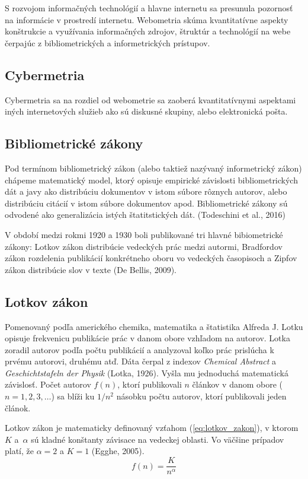 S rozvojom informačných technológií a hlavne internetu sa presunula pozornosť na
informácie v prostredí internetu.  Webometria skúma kvantitatívne aspekty
konštrukcie a využívania informačných zdrojov, štruktúr a technológií na webe
čerpajúc z bibliometrických a informetrických prístupov.


\subsection{Cybermetria}

Cybermetria sa na rozdiel od webometrie sa zaoberá kvantitatívnymi aspektami
iných internetových služieb ako sú diskusné skupiny, alebo elektronická pošta.


\subsection{Bibliometrické zákony}

Pod termínom bibliometrický zákon (alebo taktiež nazývaný informetrický zákon)
chápeme matematický model, ktorý opisuje empirické závislosti bibliometrických
dát a javy ako distribúciu dokumentov v istom súbore rôznych autorov, alebo
distribúciu citácií v istom súbore dokumentov apod.  Bibliometrické zákony sú
odvodené ako generalizácia istých štatitstických dát.  (Todeschini et al., 2016)

V období medzi rokmi 1920 a 1930 boli publikované tri hlavné bibiometrické
zákony: Lotkov zákon distribúcie vedeckých prác medzi autormi, Bradfordov zákon
rozdelenia publikácií konkrétneho oboru vo vedeckých časopisoch a Zipfov zákon
distribúcie slov v texte (De Bellis, 2009).


\subsection{Lotkov zákon}

Pomenovaný podľa amerického chemika, matematika a štatistika Alfreda J.  Lotku
opisuje frekvenicu publikácie prác v danom obore vzhľadom na autorov.  Lotka
zoradil autorov podľa počtu publikácií a analyzoval koľko prác prislúcha k
prvému autorovi, druhému atď.  Dáta čerpal z indexov \emph{Chemical Abstract} a
\emph{Geschichtstafeln der Physik} (Lotka, 1926).  Vyšla mu jednoduchá
matematická závislosť.  Počet autorov $f(n)$, ktorí publikovali $n$ článkov v
danom obore ($n = 1, 2, 3, \dots$) sa blíži ku $1/n^2$ násobku počtu autorov,
ktorí publikovali jeden článok.

Lotkov zákon je matematicky definovaný vzťahom (\ref{eq:lotkov_zakon}), v ktorom
$K$ a~$\alpha$ sú kladné konštanty závisace na vedeckej oblasti.  Vo väčšine
prípadov platí, že $\alpha = 2$ a $K = 1$ (Egghe, 2005).
\begin{equation}
\label{eq:lotkov_zakon}
f(n) = \frac{K}{n^\alpha}
\end{equation}

